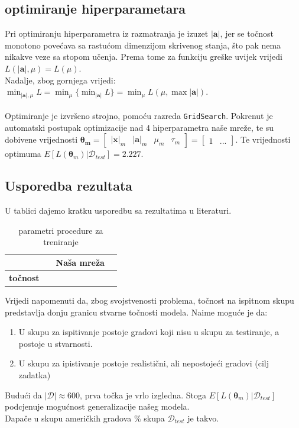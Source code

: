 \documentclass[conference]{IEEEtran}
\begin{document}
\subsection{optimiranje hiperparametara}
Pri optimiranju hiperparametra iz razmatranja je izuzet $\lvert \mathbf{a} \rvert$, jer se točnost monotono povećava sa rastućom dimenzijom skrivenog stanja, što pak nema nikakve veze sa stopom učenja. Prema tome za funkciju greške uvijek vrijedi $L(\lvert \mathbf{a} \rvert, \mu) = L(\mu)$.\\
Nadalje, zbog gornjega vrijedi: $\min_{\lvert \mathbf{a} \rvert, \mu} L = \min_{\mu} \{ \min_{\lvert \mathbf{a} \rvert} L \} = \min_{\mu} L(\mu, \max {\lvert \mathbf{a} \rvert})$.
\\
\\
Optimiranje je izvršeno strojno, pomoću razreda \texttt{GridSearch}.
Pokrenut je automatski postupak optimizacije nad 4 hiperparametra naše mreže, te su dobivene vrijednosti $\mathbf{\boldsymbol{\theta}_m} = \begin{bmatrix} \lvert \mathbf{x} \rvert_m & \lvert \mathbf{a} \rvert_m & \mu_m & \tau_m \end{bmatrix} = \begin{bmatrix} 1 & ... \end{bmatrix}$.
Te vrijednosti optimuma $E[L(\mathbf{\boldsymbol{\theta}}_m) | \mathcal{D}_{test}] = 2.227$.

\subsection{Usporedba rezultata}
U tablici dajemo kratku usporedbu sa rezultatima u literaturi.
\begin{table}[htbp]
\caption{parametri procedure za treniranje}
\begin{center}
\begin{tabular}{|c|c|c|c|}
\hline
 & \textbf{\cite{randolph}} & \textbf{Naša mreža} & \\ \hline
\textbf{točnost} & & & \\ \hline
\end{tabular}
\label{tab:trening}
\end{center}
\end{table}


Vrijedi napomenuti da, zbog svojstvenosti problema, točnost na ispitnom skupu predstavlja donju granicu stvarne točnosti modela. Naime moguće je da:
\begin{enumerate}
\item U skupu za ispitivanje postoje gradovi koji nisu u skupu za testiranje, a postoje u stvarnosti.
\item U skupu za ipistivanje postoje realistični, ali nepostojeći gradovi (cilj zadatka)
\end{enumerate}
Budući da $\lvert \mathcal{D} \rvert \approx 600$, prva točka je vrlo izgledna. Stoga $E[L(\mathbf{\boldsymbol{\theta}}_m) | \mathcal{D}_{test}]$ podcjenuje mogućnost generalizacije našeg modela.\\
Dapače u skupu američkih gradova $\%$ skupa $\mathcal{D}_{test}$ je takvo.
\end{document}
